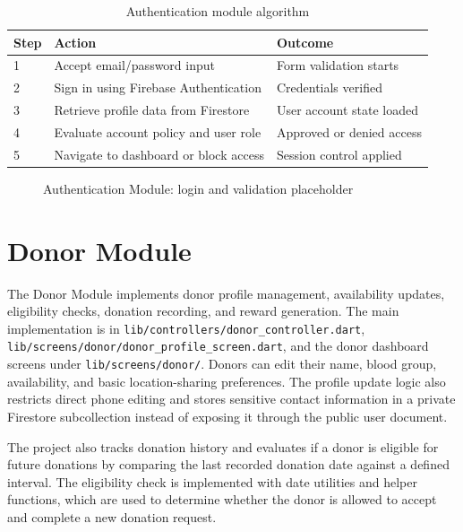 \begin{table}[H]
\centering
\caption{Authentication module algorithm}
\begin{tabularx}{\textwidth}{|p{4.2cm}|X|p{4.0cm}|}
\hline
\textbf{Step} & \textbf{Action} & \textbf{Outcome} \\
\hline
1 & Accept email/password input & Form validation starts \\
\hline
2 & Sign in using Firebase Authentication & Credentials verified \\
\hline
3 & Retrieve profile data from Firestore & User account state loaded \\
\hline
4 & Evaluate account policy and user role & Approved or denied access \\
\hline
5 & Navigate to dashboard or block access & Session control applied \\
\hline
\end{tabularx}
\end{table}

\begin{figure}[H]
\centering
{}
\caption{Authentication Module: login and validation placeholder}
\end{figure}


\section{Donor Module}

The Donor Module implements donor profile management, availability updates, eligibility checks, donation recording, and reward generation. The main implementation is in \texttt{lib/controllers/donor_controller.dart}, \texttt{lib/screens/donor/donor_profile_screen.dart}, and the donor dashboard screens under \texttt{lib/screens/donor/}. Donors can edit their name, blood group, availability, and basic location-sharing preferences. The profile update logic also restricts direct phone editing and stores sensitive contact information in a private Firestore subcollection instead of exposing it through the public user document.

The project also tracks donation history and evaluates if a donor is eligible for future donations by comparing the last recorded donation date against a defined interval. The eligibility check is implemented with date utilities and helper functions, which are used to determine whether the donor is allowed to accept and complete a new donation request.

